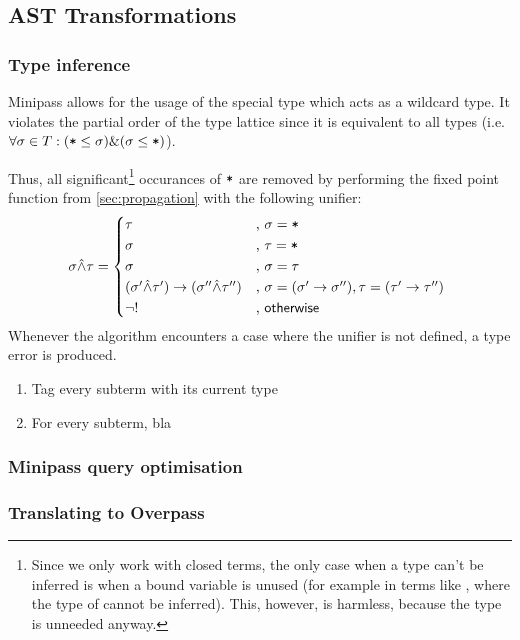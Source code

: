 \documentclass[main.tex]{subfiles}
\begin{document}
\subsection{AST Transformations}

\subsubsection{Type inference}
\label{sec:typeinf}
Minipass allows for the usage of the special type \code{*} which acts as a
wildcard type. It violates the partial order of the type lattice since it is
equivalent to all types (i.e. $\forall \sigma \in T: (\text{\mbox{\texttt{*}}} \leq \sigma)
\& (\sigma \leq \text{\mbox{\texttt{*}}})$).

Thus, all significant\footnote{
    Since we only work with closed terms, the only case when a type can't be
    inferred is when a bound variable is unused (for example in terms like
    , where the type of  cannot be inferred).
    This, however, is harmless, because the type is unneeded anyway.
} occurances of $\mbox{\texttt{*}}$ are removed by performing the fixed point
function from
\cref{sec:propagation} with the following unifier:
\[
    \sigma \unify \tau =
    \begin{cases*}
        \tau& , $\sigma = \text{\code{*}}$ \\
        \sigma& , $\tau = \text{\code{*}}$ \\
        \sigma& , $\sigma = \tau$ \\
        (\sigma' \unify \tau') \tot (\sigma'' \unify \tau'')& ,
            $\sigma = (\sigma' \tot \sigma''), \tau = (\tau' \tot \tau'')$ \\
        \lnot !& , $\mathsf{otherwise}$ \\
    \end{cases*}
\]
Whenever the algorithm encounters a case where the unifier is not defined,
a type error is produced.


\begin{enumerate}
    \item Tag every subterm with its current type
    \item For every subterm, bla
\end{enumerate}

\subsubsection{Minipass query optimisation}

\subsubsection{Translating to Overpass}
\end{document}

